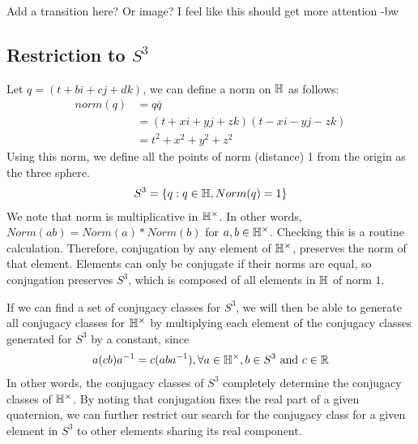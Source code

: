 \documentclass{article}
\begin{document}


{\color{blue}Add a transition here? Or image? I feel like this should get more attention -bw}


\subsection{Restriction to $S^3$}
Let $q=(t +bi+cj+dk)$, we can define a norm on $\protect\mathbb{H}$ as follows: 
\begin{align*}
    norm(q) &= q\overline{q}  \\
    &= (t + xi+yj+zk)(t-xi-yj-zk) \\
    &= t^2 + x^2 + y^2 + z^2
\end{align*}
Using this norm, we define all the points of norm (distance) 1 from the origin as the three sphere.
\begin{gather*}
    S^3 = \{q : q \in \protect\mathbb{H}, Norm(q) = 1\}
\end{gather*}
 We note that norm is multiplicative in $\protect\mathbb{H}^\times$. In other words, $Norm(ab)= Norm(a)*Norm(b)$ for $a,b \in \protect\mathbb{H}^\times$. Checking this is a routine calculation. Therefore, conjugation by any element of $\protect\mathbb{H}^\times$, preserves the norm of that element. Elements can only be conjugate if their norms are equal, so conjugation preserves $S^3$, which is composed of all elements in $\protect\mathbb{H}$ of norm $1$.  

If we can find a set of conjugacy classes for $S^3$, we will then be able to generate all conjugacy classes for $\protect\mathbb{H}^\times$ by multiplying each element of the conjugacy classes generated for $S^3$ by a constant, since
\begin{gather*}
    a(cb)a^{-1}=c(aba^{-1}),  \forall a \in \protect\mathbb{H}^\times, b \in S^3 \text{ and } c \in \protect\mathbb{R}
\end{gather*} 
In other words, the conjugacy classes of $S^3$ completely determine the conjugacy classes of $\protect\mathbb{H}^{\times}$. By noting that conjugation fixes the real part of a given quaternion, we can further restrict our search for the conjugacy class for a given element in $S^3$ to other elements sharing its real component. 
\end{document}
